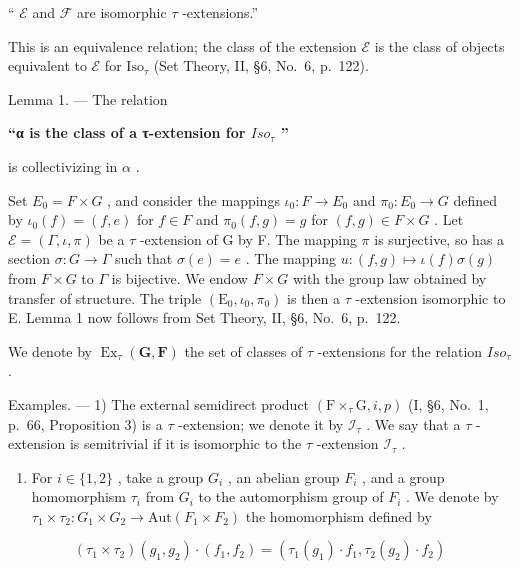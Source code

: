`` \(\mathcal{E}\) and \(\mathcal{F}\) are isomorphic \(\tau\) -extensions.''

This is an equivalence relation; the class of the extension \(\mathcal{E}\) is the class of objects equivalent to \(\mathcal{E}\) for \(\mathrm{Iso}_{\tau}\) (Set Theory, II, §6, No.~6, p.~122).

Lemma 1. --- The relation

\textbf{\texorpdfstring{``α is the class of a τ-extension for \(Iso_{\tau}\) ''}{``α is the class of a τ-extension for Iso\_\{\textbackslash tau\} ''}}

is collectivizing in \(\alpha\) .

Set \(E_{0}=F\times G\) , and consider the mappings \(\iota_{0}:F\to E_{0}\) and \(\pi_{0}:E_{0}\to G\) defined by \(\iota_{0}(f)=(f,e)\) for \(f\in F\) and \(\pi_{0}(f,g)=g\) for \((f,g)\in F\times G\) . Let \(\mathcal{E}=(\Gamma,\iota,\pi)\) be a \(\tau\) -extension of G by F. The mapping \(\pi\) is surjective, so has a section \(\sigma:G\to\Gamma\) such that \(\sigma(e)=e\) . The mapping \(u:(f,g)\mapsto\iota(f)\sigma(g)\) from \(F\times G\) to \(\Gamma\) is bijective. We endow \(F\times G\) with the group law obtained by transfer of structure. The triple \((\mathrm{E}_{0},\iota_{0},\pi_{0})\) is then a \(\tau\) -extension isomorphic to E. Lemma 1 now follows from Set Theory, II, §6, No.~6, p.~122.

We denote by \(\operatorname{Ex}_{\tau}(\mathbf{G},\mathbf{F})\) the set of classes of \(\tau\) -extensions for the relation \(Iso_{\tau}\) .

Examples. --- 1) The external semidirect product \((\mathrm{F} \times_{\tau} \mathrm{G}, i, p)\) (I, §6, No.~1, p.~66, Proposition 3) is a \(\tau\) -extension; we denote it by \(\mathcal{I}_{\tau}\) . We say that a \(\tau\) -extension is semitrivial if it is isomorphic to the \(\tau\) -extension \(\mathcal{I}_{\tau}\) .

\begin{enumerate}
\def\labelenumi{\arabic{enumi})}
\setcounter{enumi}{1}
\tightlist
\item
  For \(i \in \{1,2\}\) , take a group \(G_{i}\) , an abelian group \(F_{i}\) , and a group homomorphism \(\tau_{i}\) from \(G_{i}\) to the automorphism group of \(F_{i}\) . We denote by \(\tau_{1} \times \tau_{2}: G_{1} \times G_{2} \to \text{Aut}(F_{1} \times F_{2})\) the homomorphism defined by
\end{enumerate}

\[
(\tau_ {1} \times \tau_ {2}) (g _ {1}, g _ {2}) \cdot (f _ {1}, f _ {2}) = (\tau_ {1} (g _ {1}) \cdot f _ {1}, \tau_ {2} (g _ {2}) \cdot f _ {2})
\]

